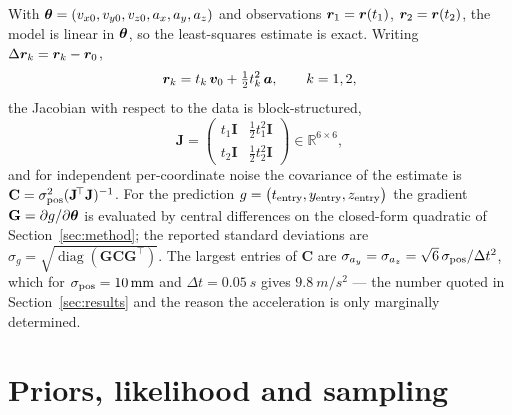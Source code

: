 With $\bm{\theta}=(v_{x0},v_{y0},v_{z0},a_x,a_y,a_z)$ and observations
$\bm{r}_1=\bm{r}(t_1)$, $\bm{r}_2=\bm{r}(t_2)$, the model is linear in
$\bm{\theta}$, so the least-squares estimate is exact. Writing
$\Delta\bm{r}_k=\bm{r}_k-\bm{r}_0$,
\begin{equation}
  \bm{r}_k = t_k\,\bm{v}_0 + \tfrac12 t_k^{2}\,\bm{a} ,
  \qquad k=1,2 ,
\end{equation}
the Jacobian with respect to the data is block-structured,
\begin{equation}
  \mathbf{J} =
  \begin{pmatrix}
    t_1\mathbf{I} & \tfrac12 t_1^{2}\mathbf{I}\\[2pt]
    t_2\mathbf{I} & \tfrac12 t_2^{2}\mathbf{I}
  \end{pmatrix}
  \in\mathbb R^{6\times 6} ,
\end{equation}
and for independent per-coordinate noise the covariance of the
estimate is $\mathbf{C}=\sigma_{\rm pos}^{2}(\mathbf{J}^{\!\top}\mathbf{J})^{-1}$.
For the prediction $g=\bigl(t_{\rm entry},y_{\rm entry},z_{\rm entry}\bigr)$
the gradient $\mathbf{G}=\partial g/\partial\bm{\theta}$ is evaluated by central
differences on the closed-form quadratic of Section~\ref{sec:method}; the
reported standard deviations are
$\sigma_g=\sqrt{\operatorname{diag}(\mathbf{G}\mathbf{C}\mathbf{G}^{\!\top})}$.
The largest entries of $\mathbf{C}$ are
$\sigma_{a_y}=\sigma_{a_z}=\sqrt{6}\,\sigma_{\rm pos}/\Delta t^{2}$, which
for $\sigma_{\rm pos}=\SI{10}{mm}$ and $\Delta t=\SI{0.05}{s}$ gives
$\SI{9.8}{m/s^2}$ --- the number quoted in Section~\ref{sec:results} and the
reason the acceleration is only marginally determined.

\section{Priors, likelihood and sampling}
\label{app:priors}

